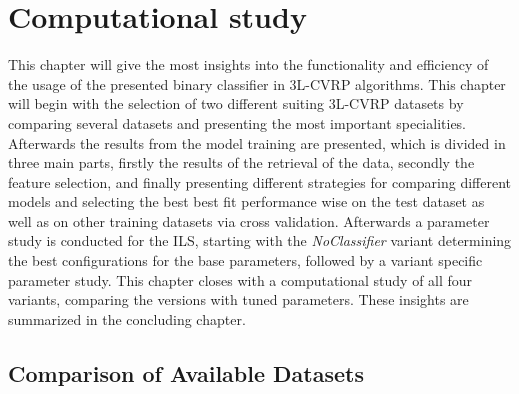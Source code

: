 \chapter{Computational study}
\label{chap:computational_study}
This chapter will give the most insights into the functionality and efficiency of the usage of the presented binary classifier in
\gls{3L-CVRP} algorithms. This chapter will begin with the selection of two different suiting \gls{3L-CVRP} datasets by comparing
several datasets and presenting the most important specialities. Afterwards the results from the model training are presented, which
is divided in three main parts, firstly the results of the retrieval of the data, secondly the feature selection, and finally presenting
different strategies for comparing different models and selecting the best best fit performance wise on the test dataset as well as on other
training datasets via cross validation. Afterwards a parameter study is conducted for the \gls{ILS}, starting with the \textit{NoClassifier} variant determining
the best configurations for the base parameters, followed by a variant specific parameter study.
This chapter closes with a computational study of all four variants, comparing the versions with tuned parameters.
These insights are summarized in the concluding chapter.

\section{Comparison of Available Datasets}
\label{sec:dataset_selection}

